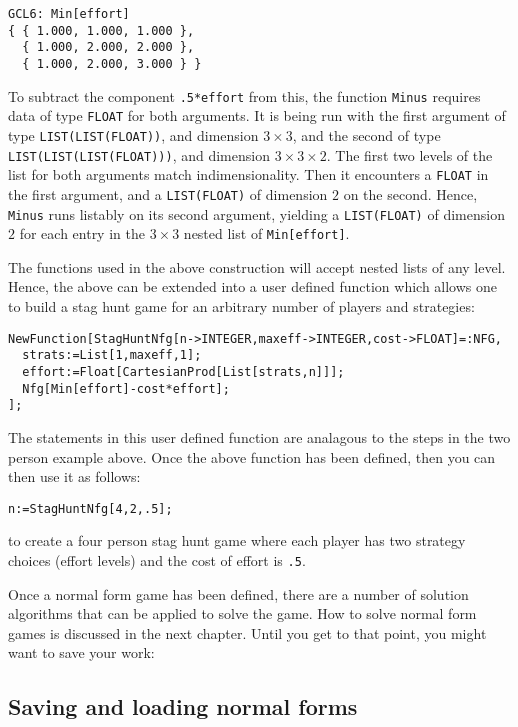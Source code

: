 \begin{verbatim}
GCL6: Min[effort]
{ { 1.000, 1.000, 1.000 },
  { 1.000, 2.000, 2.000 },
  { 1.000, 2.000, 3.000 } }
\end{verbatim}

\noindent
To subtract the component \verb+.5*effort+ from this, the function
\verb+Minus+ requires data of type \verb+FLOAT+ for both arguments.
It is being run with the first argument of type
\verb+LIST(LIST(FLOAT))+, and dimension $3\times 3$, and the second of
type \verb+LIST(LIST(LIST(FLOAT)))+, and dimension $3\times 3\times
2$.  The first two levels of the list for both arguments match
indimensionality.  Then it encounters a \verb+FLOAT+ in the first
argument, and a \verb+LIST(FLOAT)+ of dimension $2$ on the second.
Hence, \verb+Minus+ runs listably on its second argument, yielding a
\verb+LIST(FLOAT)+ of dimension $2$ for each entry in the $3\times 3$
nested list of \verb+Min[effort]+. 

The functions used in the above construction will accept nested lists
of any level.  Hence, the above can be extended into a user defined
function which allows one to build a stag hunt game for an arbitrary
number of players and strategies:

\begin{verbatim}
NewFunction[StagHuntNfg[n->INTEGER,maxeff->INTEGER,cost->FLOAT]=:NFG,
  strats:=List[1,maxeff,1];
  effort:=Float[CartesianProd[List[strats,n]]];
  Nfg[Min[effort]-cost*effort];
];
\end{verbatim}

\noindent
The statements in this user defined function are analagous to the
steps in the two person example above.  Once the above function has
been defined, then you can then use it as follows:

\begin{verbatim}
n:=StagHuntNfg[4,2,.5];
\end{verbatim}

\noindent
to create a four person stag hunt game where each player has two
strategy choices (effort levels) and the cost of effort is \verb+.5+.

Once a normal form game has been defined, there are a number of
solution algorithms that can be applied to solve the game.  How to
solve normal form games is discussed in the next chapter.  Until you
get to that point, you might want to save your work:

\subsection{Saving and loading normal forms}


